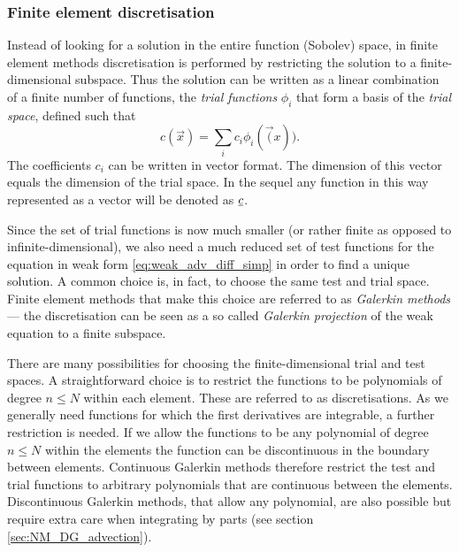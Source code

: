 \subsubsection{Finite element discretisation}
Instead of looking for a solution in the entire function (Sobolev) space,
in finite element methods discretisation is performed by restricting the solution to a
finite-dimensional subspace. Thus the solution can be
written as a linear combination of a finite number of functions,
the \emph{trial functions} $\phi_i$ that form a basis of the
\emph{trial space}, defined such that
\begin{equation*}
  c(\vec{x})=\sum_i c_i \phi_i(\vec(x)).
\end{equation*}
The coefficients $c_i$ can be written in vector format. The
dimension of this vector equals the dimension of the trial
space. In the sequel any function in
this way represented as a vector will be denoted as $\underline{c}$.

Since the set of trial functions is now much smaller (or rather finite as opposed to infinite-dimensional), we also need
a much reduced set of test functions for the equation in weak
form \eqref{eq:weak_adv_diff_simp} in order to find a unique
solution. A common choice is, in fact, to choose the same
test and trial space. Finite element methods that make this choice are
referred to as \emph{Galerkin methods} --- the discretisation
can be seen as a so called \emph{Galerkin
projection} of the weak equation to a finite subspace.

There are many possibilities for choosing the finite-dimensional trial and test spaces.
A straightforward choice is to restrict the functions to be polynomials of degree
$n\leq N$ within each element. These are referred to as \PN discretisations.
As we generally need functions for which the first
derivatives are integrable, a further restriction
is needed. If we allow the functions to be any polynomial of
degree $n\leq N$ within the elements the function can be
discontinuous in the boundary between elements.
Continuous Galerkin methods therefore
restrict the test and trial functions to arbitrary polynomials
that are continuous between the elements. Discontinuous Galerkin methods,
that allow any polynomial, are also possible but require
extra care when integrating by parts (see section \ref{sec:NM_DG_advection}).

